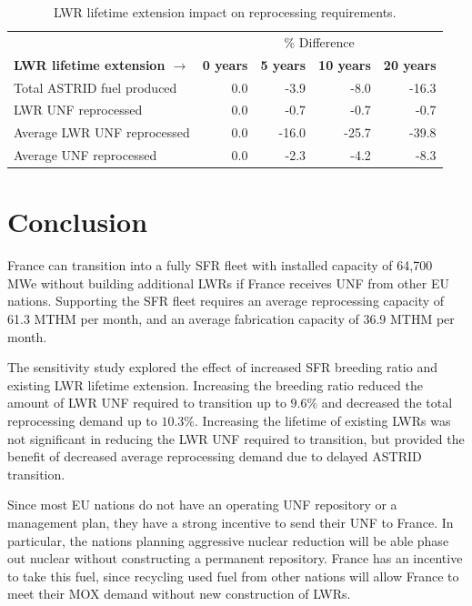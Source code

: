 \begin{table}[h]
	\centering
	\caption{\gls{LWR} lifetime extension impact on reprocessing requirements.}
	\begin{tabular}{lrrrr}
		\hline
		& \multicolumn{4}{c}{\% Difference} \\
		\textbf{\gls{LWR} lifetime extension $\longrightarrow$}& \textbf{0 years}& \textbf{5 years} & \textbf{10 years} & \textbf{20 years} \\
		\hline
		Total \gls{ASTRID} fuel produced & 0.0 & -3.9 & -8.0 & -16.3 \\
		\gls{LWR} \gls{UNF} reprocessed & 0.0  & -0.7 & -0.7 & -0.7 \\
		Average \gls{LWR} \gls{UNF} reprocessed & 0.0 & -16.0 & -25.7 & -39.8 \\
		Average \gls{UNF} reprocessed & 0.0 & -2.3 & -4.2 & -8.3 \\
		\hline
	\end{tabular}
	\label{tab:ext_met}
\end{table}


\FloatBarrier

\section{Conclusion}

France can transition into
a fully \gls{SFR} fleet with installed capacity of 64,700 \gls{MWe} without
building additional \glspl{LWR}
if France receives \gls{UNF} from other \gls{EU} nations.
Supporting the \gls{SFR} fleet requires an average 
reprocessing capacity of 61.3 \gls{MTHM} per month,
and an average fabrication capacity of 36.9 \gls{MTHM} per month.

The sensitivity study explored the effect of increased \gls{SFR} breeding
ratio and existing \gls{LWR} lifetime extension. Increasing the breeding
ratio reduced the amount of \gls{LWR} \gls{UNF} required to transition
up to $9.6\%$ and decreased the total reprocessing demand up to $10.3\%$.
Increasing the lifetime of existing \glspl{LWR} was not significant
in reducing the \gls{LWR} \gls{UNF} required to transition, but provided the benefit of
decreased average reprocessing demand due to delayed \gls{ASTRID} transition.

Since most \gls{EU} nations do not have an operating \gls{UNF}
repository or a management plan, they have a strong incentive
to send their \gls{UNF} to France. In particular, the nations
planning aggressive nuclear reduction will be able phase out nuclear
without constructing a permanent repository. France has an
incentive to take this fuel, since recycling used fuel from
other nations will allow France to meet their MOX demand
without new construction of \glspl{LWR}.

